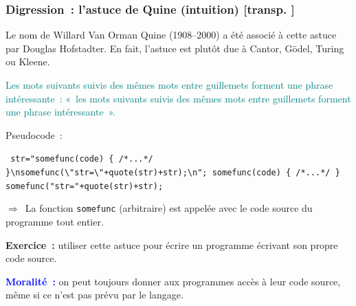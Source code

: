 \documentclass[mathserif,a4paper,aspectratio=169]{beamer}
\renewcommand{\frametitle}[1]{\subsubsection*{#1 {\footnotesize[transp. \insertframenumber]}}}
\begin{document}
\begin{frame}
\frametitle{Digression : l'astuce de Quine (intuition)}

{\footnotesize Le nom de Willard Van Orman Quine (1908–2000) a été
  associé à cette astuce par Douglas Hofstadter.  En fait, l'astuce
  est plutôt due à Cantor, Gödel, Turing ou Kleene.\par}

\smallskip

\textcolor{teal}{Les mots suivants suivis des mêmes mots entre
  guillemets forment une phrase intéressante : « les mots suivants
  suivis des mêmes mots entre guillemets forment une phrase
  intéressante ».}

\bigskip

Pseudocode :

\smallskip

{\footnotesize\texttt{%
str="somefunc(code) \{ /*...*/ \}\textbackslash nsomefunc(\textbackslash"str=\textbackslash"+quote(str)+str);\textbackslash n";\newline
somefunc(code) \{ /*...*/ \}\newline
somefunc("str="+quote(str)+str);
}\par}

\smallskip

$\Rightarrow$ La fonction \texttt{somefunc} (arbitraire) est appelée
avec le code source du programme \alert{tout entier}.

\medskip

{\footnotesize\textbf{Exercice :} utiliser cette astuce pour écrire un
  programme écrivant son propre code source.\par}

\bigskip

\textcolor{blue}{\textbf{Moralité :}} \alert{on peut toujours donner aux programmes
  accès à leur code source}, même si ce n'est pas prévu par le
langage.

\end{frame}
%
\end{document}
